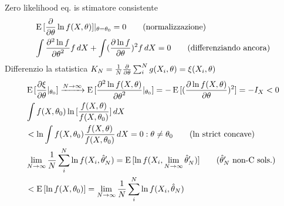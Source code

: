 \documentclass[asd-beamer.tex]{subfiles}%
\begin{document}
\begin{wordonframe}{Zero likelihood eq. is stimatore consistente}
\begin{align*}
&\operatorname{E}{[\frac{\partial}{\partial \theta}\ln{f(X,\theta)}]}|_{\theta=\theta_0}=0\tag{normalizzazione}\\
&\int\frac{\partial^2 \ln{f}}{{\partial \theta}^2}f\,dX+\int(\frac{\partial \ln{f}}{\partial \theta})^2f\,dX=0\tag{differenziando ancora}
\end{align*}
Differenzio la statistica $K_N=\frac{1}{N}\frac{\partial}{\partial \theta}\sum_i^Ng(X_i,\theta)=\xi(X_i,\theta)$
\begin{align*}
&\E{[\PDy{\theta}{\xi}|_{\theta_0}]}\xrightarrow{N\to\infty}\E{[\PtwoDy{\theta}{\ln{f(X,\theta)}}|_{\theta_0}]}=-\E{[(\PDy{\theta}{\ln{f(X,\theta)}})^2]}=-I_X<0\\
&\int f(X,\theta_0)\ln{[\frac{f(X,\theta)}{f(X,\theta_0)}]}\,dX\\
&<\ln{\int f(X,\theta_0)\frac{f(X,\theta)}{f(X,\theta_0)}\,dX}=0: \theta\neq\theta_0\tag{$\ln$ strict concave}\\
&\lim_{N\to\infty}\frac{1}{N}\sum_i^N\ln{f(X_i,\hat{\theta}_N')}=\E{[\ln{f(X_i,\lim_{N\to\infty}\hat{\theta}_N')}]}\tag{$\hat{\theta}_N'$ non-C sols.}\\
&<\E{[\ln{f(X,\theta_0)}]}=\lim_{N\to\infty}\frac{1}{N}\sum_i^N\ln{f(X_i,\hat{\theta}_N)}
\end{align*}
\end{wordonframe}
\end{document}
